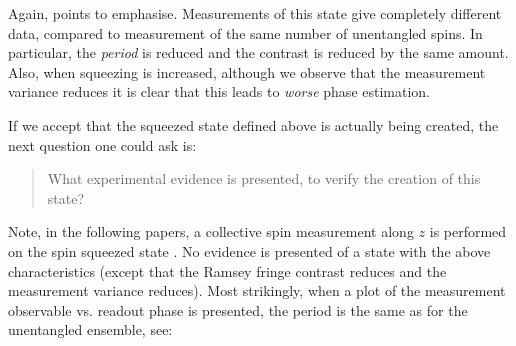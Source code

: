 \documentclass[reqno]{amsart}
\begin{document}
Again, points to emphasise. Measurements of this state give completely different data, compared to measurement of the same number of unentangled spins. In particular, the \textit{period} is reduced and the contrast is reduced by the same amount. Also, when squeezing is increased, although we observe that the measurement variance reduces it is clear that this leads to \textit{worse} phase estimation.

If we accept that the squeezed state defined above is actually being created, the next question one could ask is:
\begin{quotation}
What experimental evidence is presented, to verify the creation of this state?
\end{quotation}

Note, in the following papers, a collective spin measurement along $z$ is performed on the spin squeezed state \cite{Appel2009, Gross2010, Leroux2010, Leroux2010a, LouchetChauvet2010, SchleierSmith2010, Bohnet2014, Muessel2014, Strobel2014, Cox2016, Hosten2016, Linnemann2016, Braverman2019, Malia2020, Bao2020, PedrozoPenafiel2020, Greve2022, Malia2022, Riedel2010, Hosten2016a, Colombo2022}. No evidence is presented of a state with the above characteristics (except that the Ramsey fringe contrast reduces and the measurement variance reduces). Most strikingly, when a plot of the measurement observable vs. readout phase is presented, the period is the same as for the unentangled ensemble, see:
\end{document}
